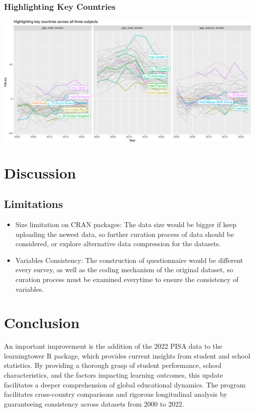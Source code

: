 \documentclass[
  11pt,
  a4paper,
]{article}
\begin{document}
\subsubsection{Highlighting Key
Countries}\label{highlighting-key-countries}

\includegraphics{Learningtower_Rpackage_files/figure-pdf/unnamed-chunk-22-1.pdf}

\section{Discussion}\label{discussion}

\subsection{Limitations}\label{limitations}

\begin{itemize}
\item
  Size limitation on CRAN packages: The data size would be bigger if
  keep uploading the newest data, so further curation process of data
  should be considered, or explore alternative data compression for the
  datasets.
\item
  Variables Consistency: The construction of questionnaire would be
  different every survey, as well as the coding mechanism of the
  original dataset, so curation process must be examined everytime to
  ensure the consistency of variables.
\end{itemize}

\section{Conclusion}\label{conclusion}

An important improvement is the addition of the 2022 PISA data to the
learningtower R package, which provides current insights from student
and school statistics. By providing a thorough grasp of student
performance, school characteristics, and the factors impacting learning
outcomes, this update facilitates a deeper comprehension of global
educational dynamics. The program facilitates cross-country comparisons
and rigorous longitudinal analysis by guaranteeing consistency across
datasets from 2000 to 2022.
\end{document}
